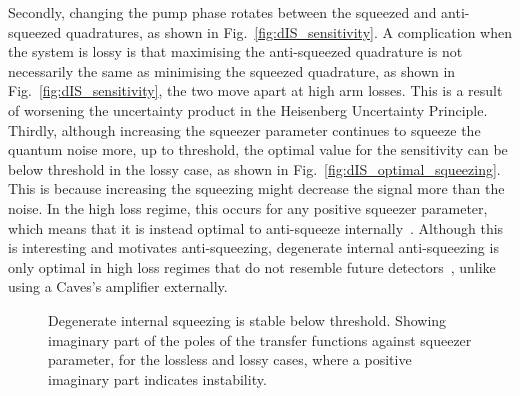 Secondly, changing the pump phase rotates between the squeezed and anti-squeezed quadratures, as shown in Fig.~\ref{fig:dIS_sensitivity}. %
A complication when the system is lossy is that maximising the anti-squeezed quadrature is not necessarily the same as minimising the squeezed quadrature, as shown in Fig.~\ref{fig:dIS_sensitivity}, the two move apart at high arm losses. This is a result of worsening the uncertainty product in the Heisenberg Uncertainty Principle. 
Thirdly, although increasing the squeezer parameter continues to squeeze the quantum noise more, up to threshold, the optimal value for the sensitivity can be below threshold in the lossy case, as shown in Fig.~\ref{fig:dIS_optimal_squeezing}. This is because increasing the squeezing might decrease the signal more than the noise. In the high loss regime, this occurs for any positive squeezer parameter, which means that it is instead optimal to anti-squeeze internally~\cite{Korobko talk}. Although this is interesting and motivates anti-squeezing, degenerate internal anti-squeezing is only optimal in high loss regimes that do not resemble future detectors~\cite{}, unlike using a Caves's amplifier externally. 


\begin{figure}
	\centering
	\caption{Degenerate internal squeezing is stable below threshold. Showing imaginary part of the poles of the transfer functions against squeezer parameter, for the lossless and lossy cases, where a positive imaginary part indicates instability.}
	\label{fig:dIS_stability}
\end{figure}


